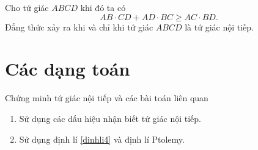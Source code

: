 \begin{dl}[Ptolemy]
Cho tứ giác $ABCD$ khi đó ta có
$$AB\cdot CD + AD\cdot BC \ge AC \cdot BD.$$
Đẳng thức xảy ra khi và chỉ khi tứ giác $ABCD$ là tứ giác nội tiếp.
\end{dl}

\section{Các dạng toán}

\begin{dang}{Chứng minh tứ giác nội tiếp và các bài toán liên quan}
\begin{enumerate}
\item Sử dụng các dấu hiệu nhận biết tứ giác nội tiếp.
\item Sử dụng định lí \ref{dinhli4} và định lí Ptolemy.
\end{enumerate}
\end{dang}


